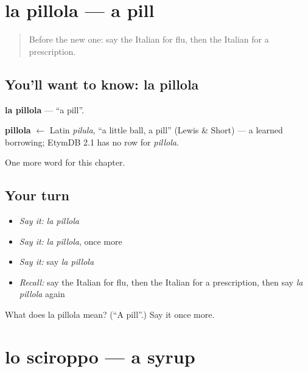 \section[la pillola]{la pillola — a pill}

\label{lesson:IT-C215-pillola}



\begin{quote}
Before the new one: say the Italian for flu, then the Italian for a prescription.
\end{quote}

\subsection*{You'll want to know: la pillola}
\textbf{la pillola} — \textquotedblleft{}a pill\textquotedblright{}.

\begin{cousinweb}
\textbf{pillola} $\leftarrow$ Latin \emph{pilula}, \textquotedblleft{}a little ball, a pill\textquotedblright{} (Lewis \& Short) — a learned borrowing; EtymDB 2.1 has no row for \emph{pillola}.
\end{cousinweb}

\begin{grammarlens}[title={What you've built}]
One more word for this chapter.
\end{grammarlens}

\subsection*{Your turn}
\begin{itemize}
\raggedright
  \item \emph{Say it:} \emph{la pillola}
  \item \emph{Say it:} \emph{la pillola}, once more
  \item \emph{Say it:} say \emph{la pillola}
  \item \emph{Recall:} say the Italian for flu, then the Italian for a prescription, then say \emph{la pillola} again
\end{itemize}

\begin{tcolorbox}[breakable,colback=teal!4,colframe=teal!35!black,title={Before you move on}]
What does la pillola mean? (\textquotedblleft{}A pill\textquotedblright{}.) Say it once more.
\end{tcolorbox}
\section[lo sciroppo]{lo sciroppo — a syrup}

